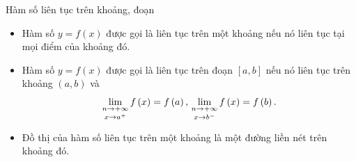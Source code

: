 \begin{dang}{Hàm số liên tục trên khoảng, đoạn}
	\begin{itemize}
		\item Hàm số $y=f(x)$ được gọi là liên tục trên một khoảng nếu nó liên tục tại mọi điểm của khoảng đó.\\
		\item Hàm số $y=f(x)$ được gọi là liên tục trên đoạn $[a,b]$ nếu nó liên tục trên khoảng $(a,b)$ và $$\mathop {\lim \limits_{n \to +\infty}}\limits_{x \to {a^ + }} f\left( x \right) = f\left( a \right),{\rm{   }}\mathop {\lim \limits_{n \to +\infty}}\limits_{x \to {b^ - }} f\left( x \right) = f\left( b \right).$$
		\item Đồ thị của hàm số liên tục trên một khoảng là một đường liền nét trên khoảng đó.
	\end{itemize}
\end{dang}
